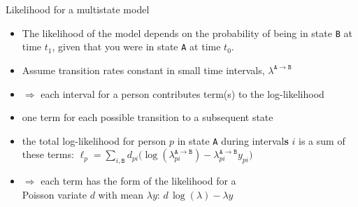 



\begin{frame}{Likelihood for a multistate model}
  \begin{itemize}
  \item The likelihood of the model depends on the probability of
    being in state \texttt{B} at time $t_1$, given that you were in
    state \texttt{A} at time $t_0$.
  \item Assume transition rates constant in small time intervals,
    $\lambda^{\mathtt{A}\rightarrow\mathtt{B}}$
  \item $\Rightarrow$ each interval for a person contributes term(s)
    to the log-likelihood
  \item one term for each possible transition to a subsequent state
  \item the total log-likelihood for person $p$ in state \texttt{A}
    during interval\textbf{s} $i$ is a
    sum of these terms:
    \alert<6>{$\ell_p = \sum_{i,\mathtt{B}}d_{pi}\big(
      \log(\lambda^{\mathtt{A}\rightarrow\mathtt{B}}_{pi})-
           \lambda^{\mathtt{A}\rightarrow\mathtt{B}}_{pi}y_{pi}\big)$}
  \item $\Rightarrow$ each term has the form of the likelihood for a\\
    Poisson variate \alert<6>{$d$} with mean \alert<6>{$\lambda y$}:
    \alert<6>{$d\,\log(\lambda) - \lambda y$}
  \end{itemize}
\end{frame}

